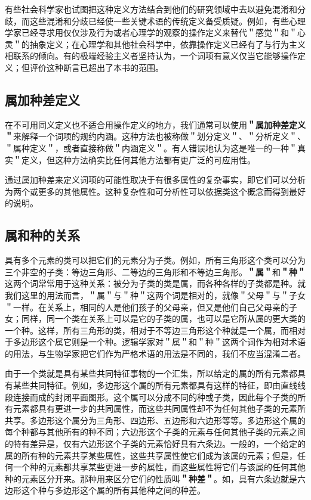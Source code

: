 有些社会科学家也试图把这种定义方法结合到他们的研究领域中去以避免混淆和分歧，而这些混淆和分歧已经使一些关键术语的传统定义备受质疑。例如，有些心理学家已经寻求用仅仅涉及行为或者心理学的观察的操作定义来替代＂感觉＂和＂心灵＂的抽象定义；在心理学和其他社会科学中，依靠操作定义已经有了与行为主义相联系的倾向。有的极端经验主义者坚持认为，一个词项有意义仅当它能够操作定义；但评价这种断言已超出了本书的范围。

\subsection{属加种差定义}

在不可用同义定义也不适合用操作定义的地方，我们通常可以使用\textbf{＂属加种差定义＂}来解释一个词项的规约内涵。这种方法也被称做＂划分定义＂、＂分析定义＂、＂属种定义＂，或者直接称做＂内涵定义＂。有人错误地认为这是唯一的一种＂真实＂定义，但这种方法确实比任何其他方法都有更广泛的可应用性。

通过属加种差来定义词项的可能性取决于有很多属性的复杂事实，即它们可以分析为两个或更多的其他属性。这种复杂性和可分析性可以依据类这个概念而得到最好的说明。

\subsection{属和种的关系}

具有多个元素的类可以把它们的元素分为子类。例如，所有三角形这个类可以分为三个非空的子类：等边三角形、二等边的三角形和不等边三角形。\textbf{＂属＂}和\textbf{＂种＂}这两个词常常用于这种关系：被分为子类的类是属，而各种各样的子类都是种。就我们这里的用法而言，＂属＂与＂种＂这两个词是相对的，就像＂父母＂与＂子女＂一样。在关系上，相同的人是他们孩子的父母亲，但又是他们自己父母亲的子女；同样，同一个类在关系上可以是它的子类的属，也可以是它所从属的更大类的一个种。这样，所有三角形的类，相对于不等边三角形这个种就是一个属，而相对于多边形这个属它则是一个种。逻辑学家对＂属＂和＂种＂这两个词作为相对术语的用法，与生物学家把它们作为严格术语的用法是不同的，我们不应当混淆二者。

由于一个类就是具有某些共同特征事物的一个汇集，所以给定的属的所有元素都具有某些共同特征。例如，多边形这个属的所有元素都具有这样的特征，即由直线线段连接而成的封闭平面图形。这个属可以分成不同的种或子类，因此每个子类的所有元素都具有更进一步的共同属性，而这些共同属性却不为任何其他子类的元素所共享。多边形这个属分为三角形、四边形、五边形和六边形等等。多边形这个属的每个种都与其他所有的种不同；六边形这个子类的元素与任何其他子类的元素之间的特有差异是，仅有六边形这个子类的元素恰好具有六条边。一般的，一个给定的属的所有种的元素共享某些属性，这些共享属性使它们成为该属的元素；但是，任何一个种的元素都共享某些更进一步的属性，而这些属性将它们与该属的任何其他种的元素区分开来。那种用来区分它们的性质叫\textbf{＂种差＂}。如，具有六条边就是六边形这个种与多边形这个属的所有其他种之间的种差。


